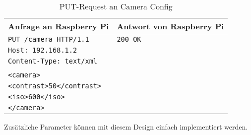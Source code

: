 \begin{table}[h!]
	\centering
	\begin{tabular}{|l|l|}
		\hline	Anfrage an Raspberry Pi 			& Antwort von Raspberry Pi	\\ 
		\hline 	\verb|PUT /camera HTTP/1.1| 		& \verb|200 OK| 			\\
				\verb|Host: 192.168.1.2| 		 	& 							\\
				\verb|Content-Type: text/xml|	 	&  							\\
													&  							\\
				\verb|<camera>|	 				 	&  							\\
				\verb|<contrast>50</contrast>|	 	&  							\\
				\verb|<iso>600</iso>|	 			&  							\\
				\verb|</camera>|	 				&  							\\ 
		\hline 
	\end{tabular} 
	\caption{PUT-Request an Camera Config}
	\label{tab:put-camera-config}
\end{table}

Zusätzliche Parameter können mit diesem Design einfach implementiert werden.